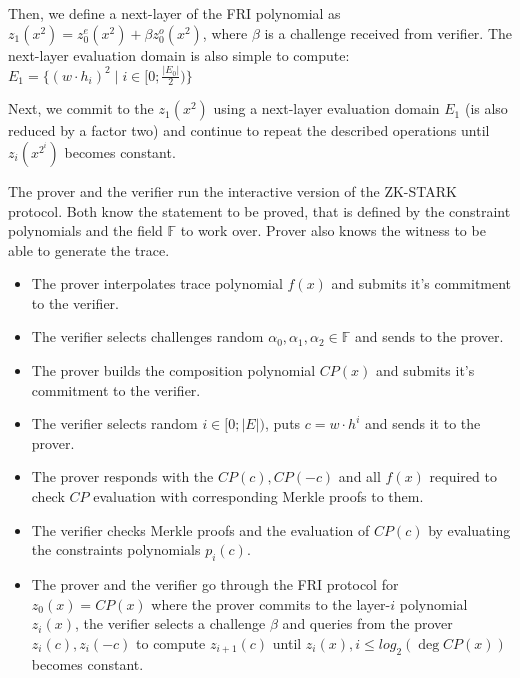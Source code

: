 \documentclass[../lecture-notes.tex]{subfiles}
\begin{document}
Then, we define a next-layer of the FRI polynomial as $z_1(x^2) = z_0^e(x^2) + \beta z_0^o(x^2)$, where $\beta$ is a challenge received from verifier. The next-layer evaluation domain is also simple to compute: $E_1 = \{(w\cdot h_i)^2 \;|\; i \in [0;\frac{|E_0|}{2})\}$

Next, we commit to the $z_1(x^2)$ using a next-layer evaluation domain $E_1$ (is also reduced by a factor two) and continue to repeat the described operations until $z_i(x^{2^i})$ becomes constant.

\begin{tcolorbox}[title=Interactive ZK-STARK protocol,
    colback=blue!5!white,
    colframe=blue!75!black,
    colbacktitle=blue!25!white,
    coltitle=blue!20!black,
    fonttitle=\bfseries,
    boxrule=1.25pt,
    subtitle style={boxrule=0pt,
    colback=blue!20!white,
    colupper=blue!75!gray} ]
    \small

    The prover and the verifier run the interactive version of the ZK-STARK protocol. Both know the statement to be proved, that is defined by the constraint polynomials and the field $\mathbb{F}$ to work over. Prover also knows the witness to be able to generate the trace.

    \begin{itemize}[label=]
        \item The prover interpolates trace polynomial $f(x)$ and submits it's commitment to the verifier.
        \item The verifier selects challenges random $\alpha_0, \alpha_1, \alpha_2 \in \mathbb{F}$ and sends to the prover.
        \item The prover builds the composition polynomial $CP(x)$ and submits it's commitment to the verifier.
    \end{itemize}

    \begin{itemize}[label=]
        \item The verifier selects random $i \in [0; |E|)$, puts $c = w\cdot h^i$ and sends it to the prover.
        \item The prover responds with the $CP(c), CP(-c)$ and all $f(x)$ required to check $CP$ evaluation with corresponding Merkle proofs to them.
        \item The verifier checks Merkle proofs and the evaluation of $CP(c)$ by evaluating the constraints polynomials $p_i(c)$.
        \item The prover and the verifier go through the FRI protocol for $z_0(x) = CP(x)$ where the prover commits to the layer-$i$ polynomial $z_i(x)$, the verifier selects a challenge $\beta$ and queries from the prover $z_i(c), z_i(-c)$ to compute $z_{i+1}(c)$ until $z_i(x), i \leq log_2(\deg CP(x))$ becomes constant.
    \end{itemize}
    
\end{tcolorbox}
\end{document}

